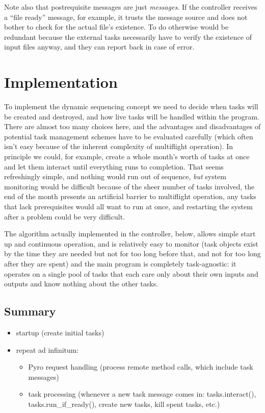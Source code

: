 \documentclass[12pt]{amsart}
\begin{document}
Note also that postrequisite messages are just {\em messages}. If the
controller receives a ``file ready'' message, for example, it trusts the
message source and does not bother to check for the actual file's
existence. To do otherwise would be redundant because the external tasks
necessarily have to verify the existence of input files anyway, and they
can report back in case of error.


\section{Implementation}

To implement the dynamic sequencing concept we need to decide when tasks
will be created and destroyed, and how live tasks will be handled within
the program.  There are almost too many choices here, and the advantages
and disadvantages of potential task management schemes have to be
evaluated carefully (which often isn't easy because of the inherent
complexity of multiflight operation). In principle we could, for
example, create a whole month's worth of tasks at once and let them
interact until everything runs to completion.  That seems refreshingly
simple, and nothing would run out of sequence, {\em but} system
monitoring would be difficult because of the sheer number of tasks
involved, the end of the month presents an artificial barrier to
multiflight operation, any tasks that lack prerequisites would all want
to run at once, and restarting the system after a problem could be very
difficult. 

The algorithm actually implemented in the controller, below, allows
simple start up and continuous operation, and is relatively easy to
monitor (task objects exist by the time they are needed but not for too
long before that, and not for too long after they are spent) and the
main program is completely task-agnostic: it operates on a single pool
of tasks that each care only about their own inputs and outputs and
know nothing about the other tasks.  

\subsection{Summary}

\begin{itemize}
    \item startup (create initial tasks)
    \item repeat ad infinitum:
    \begin{itemize}
        \item Pyro request handling (process remote method calls, which
        include task messages)
        \item task processing (whenever a new task message comes in:
        tasks.interact(), tasks.run\_if\_ready(), create new tasks, kill
        spent tasks, etc.)
    \end{itemize}
\end{itemize}
\end{document}
